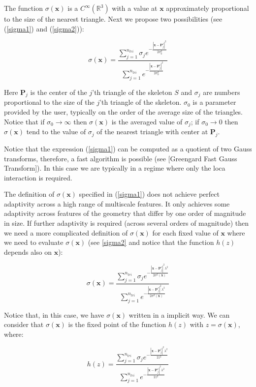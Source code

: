 \documentclass[11pt]{article}
\newcommand\bx{\boldsymbol x}
\newcommand\bP{\boldsymbol P}
\begin{document}
The function $\sigma(\bx)$ is a $C^{\infty}(\mathbb{R}^3)$ with a value at $\bx$ approximately proportional to the size of the nearest triangle. Next we propose two possibilities (see (\ref{sigma1}) and (\ref{sigma2})):

\begin{equation}\label{sigma1}
\sigma(\bx)=\frac{\sum_{j=1}^{n_{tri}}\sigma_je^{- \frac{|\bx-\bP_j^c|^2}{2\sigma^2_0}}}{\sum_{j=1}^{n_{tri}}e^{-\frac{|\bx-\bP_j^c|^2}{2\sigma^2_0}}}
\end{equation}

Here $\bP_j$ is the center of the $j$'th triangle of the skeleton $\mathit{S}$ and $\sigma_j$ are numbers proportional to the size of the $j$'th triangle of the skeleton. $\sigma_0$ is a parameter provided by the user, typically on the order of the average size of the triangles. Notice that if $\sigma_0\rightarrow \infty$ then $\sigma(\bx)$ is the averaged value of $\sigma_j$; if $\sigma_0\rightarrow 0$ then $\sigma(\bx)$ tend to the value of $\sigma_j$ of the nearest triangle with center at $\bP_j$.

Notice that the expression (\ref{sigma1}) can be computed as a quotient of two Gauss transforms, therefore, a fast algorithm is possible (see [Greengard Fast Gauss Transform]). In this case we are typically in a regime where only the loca interaction is required.

The definition of $\sigma(\bx)$ specified in (\ref{sigma1}) does not achieve perfect adaptivity across a high range of multiscale features. It only achieves some adaptivity across features of the geometry that differ by one order of magnitude in size. If further adaptivity is required (across several orders of magnitude) then we need a more complicated definition of $\sigma(\bx)$ for each fixed value of $\bx$ where we need to evaluate $\sigma(\bx)$ (see \ref{sigma2} and notice that the function $h(z)$ depends also on $\bx$):

\begin{equation}\label{sigma2}
\sigma(\bx)=\frac{\sum_{j=1}^{n_{tri}}\sigma_je^{-\frac{|\bx-\bP_j^c|^2 \lambda^2}{2\sigma^2(\bx)}}}{\sum_{j=1}^{n_{tri}}e^{-\frac{|\bx-\bP_j^c|^2 \lambda^2}{2\sigma^2(\bx)}}}
\end{equation}

Notice that, in this case, we have $\sigma(\bx)$ written in a implicit way. We can consider that $\sigma(\bx)$ is the fixed point of the function $h(z)$ with $z=\sigma(\bx)$, where:

\begin{equation}\label{sigma2}
h(z)=\frac{\sum_{j=1}^{n_{tri}}\sigma_je^{-\frac{|\bx-\bP_j^c|^2 \lambda^2}{2z^2}}}{\sum_{j=1}^{n_{tri}}e^{-\frac{|\bx-\bP_j^c|^2 \lambda^2}{2z^2}}}
\end{equation}
\end{document}
